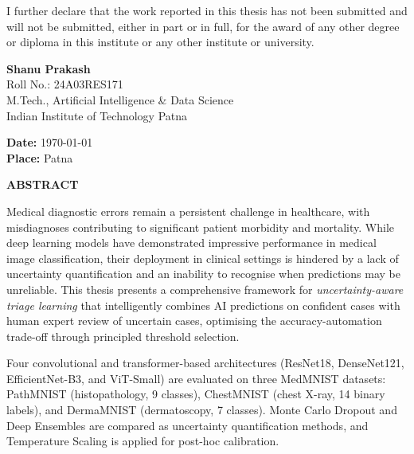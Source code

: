 \documentclass[12pt,a4paper]{report}
\begin{document}
I further declare that the work reported in this thesis has not been
submitted and will not be submitted, either in part or in full, for the
award of any other degree or diploma in this institute or any other
institute or university.

\vspace{2.5cm}

\begin{flushright}
\textbf{Shanu Prakash}\\
Roll No.: 24A03RES171\\
M.Tech., Artificial Intelligence \& Data Science\\
Indian Institute of Technology Patna
\end{flushright}

\vspace{1cm}

\noindent\textbf{Date:} \today\\[0.3em]
\noindent\textbf{Place:} Patna



\newpage
\begin{center}
{\large\bfseries ABSTRACT}
\end{center}

\vspace{0.8cm}

Medical diagnostic errors remain a persistent challenge in healthcare,
with misdiagnoses contributing to significant patient morbidity and
mortality. While deep learning models have demonstrated impressive
performance in medical image classification, their deployment in
clinical settings is hindered by a lack of uncertainty quantification
and an inability to recognise when predictions may be unreliable. This
thesis presents a comprehensive framework for \emph{uncertainty-aware
triage learning} that intelligently combines AI predictions on
confident cases with human expert review of uncertain cases, optimising
the accuracy-automation trade-off through principled threshold selection.

Four convolutional and transformer-based architectures (ResNet18,
DenseNet121, EfficientNet-B3, and ViT-Small) are evaluated on three
MedMNIST datasets: PathMNIST (histopathology, 9 classes), ChestMNIST
(chest X-ray, 14 binary labels), and DermaMNIST (dermatoscopy, 7
classes). Monte Carlo Dropout and Deep Ensembles are compared as
uncertainty quantification methods, and Temperature Scaling is applied
for post-hoc calibration.
\end{document}

